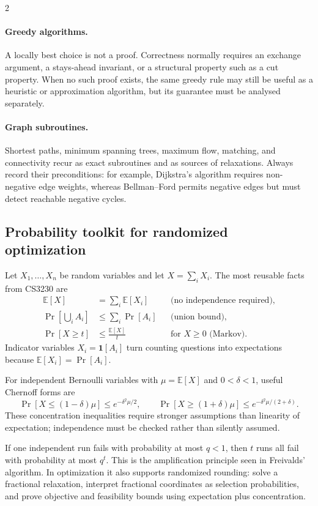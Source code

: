 \documentclass[10pt]{article}
\theoremstyle{definition}
\begin{document}
\begin{multicols*}{2}
\paragraph{Greedy algorithms.}
A locally best choice is not a proof.  Correctness normally requires an
exchange argument, a stays-ahead invariant, or a structural property such as
a cut property.  When no such proof exists, the same greedy rule may still be
useful as a heuristic or approximation algorithm, but its guarantee must be
analysed separately.

\paragraph{Graph subroutines.}
Shortest paths, minimum spanning trees, maximum flow, matching, and
connectivity recur as exact subroutines and as sources of relaxations.  Always
record their preconditions: for example, Dijkstra's algorithm requires
non-negative edge weights, whereas Bellman--Ford permits negative edges but
must detect reachable negative cycles.

\subsection{Probability toolkit for randomized optimization}

Let $X_1,\ldots,X_n$ be random variables and let
$X=\sum_i X_i$.  The most reusable facts from CS3230 are
\begin{align*}
\mathbb{E}[X]&=\sum_i\mathbb{E}[X_i]
&&\text{(no independence required)},\\
\Pr\!\left[\bigcup_i A_i\right]&\le\sum_i\Pr[A_i]
&&\text{(union bound)},\\
\Pr[X\ge t]&\le\frac{\mathbb{E}[X]}{t}
&&\text{for $X\ge0$ (Markov)}.
\end{align*}
Indicator variables $X_i=\mathbf{1}[A_i]$ turn counting questions into
expectations because $\mathbb{E}[X_i]=\Pr[A_i]$.

For independent Bernoulli variables with $\mu=\mathbb{E}[X]$ and
$0<\delta<1$, useful Chernoff forms are
\[
  \Pr[X\le(1-\delta)\mu]\le e^{-\delta^2\mu/2},\qquad
  \Pr[X\ge(1+\delta)\mu]\le e^{-\delta^2\mu/(2+\delta)}.
\]
These concentration inequalities require stronger assumptions than linearity
of expectation; independence must be checked rather than silently assumed.

If one independent run fails with probability at most $q<1$, then $t$ runs
all fail with probability at most $q^t$.  This is the amplification principle
seen in Freivalds' algorithm.  In optimization it also supports randomized
rounding: solve a fractional relaxation, interpret fractional coordinates as
selection probabilities, and prove objective and feasibility bounds using
expectation plus concentration.


\end{multicols*}
\end{document}
